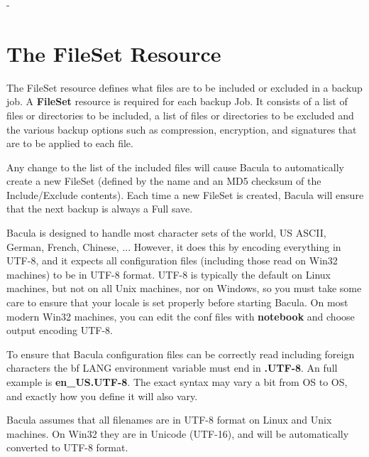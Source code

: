 -%

\section{The FileSet Resource}
\label{FileSetResource}

The FileSet resource defines what files are to be included or excluded in a
backup job.  A {\bf FileSet} resource is required for each backup Job.  It
consists of a list of files or directories to be included, a list of files
or directories to be excluded and the various backup options such as
compression, encryption, and signatures that are to be applied to each
file.

Any change to the list of the included files will cause Bacula to
automatically create a new FileSet (defined by the name and an MD5 checksum
of the Include/Exclude contents).  Each time a new FileSet is created,
Bacula will ensure that the next backup is always a Full save.

Bacula is designed to handle most character sets of the world,
US ASCII, German, French, Chinese, ...  However, it does this by
encoding everything in UTF-8, and it expects all configuration files
(including those read on Win32 machines) to be in UTF-8 format.
UTF-8 is typically the default on Linux machines, but not on all
Unix machines, nor on Windows, so you must take some care to ensure
that your locale is set properly before starting Bacula.  
On most modern Win32 machines, you can edit the conf files with {\bf
notebook} and choose output encoding UTF-8.

To ensure that Bacula configuration files can be correctly read including
foreign characters the {bf LANG} environment variable
must end in {\bf .UTF-8}. An full example is {\bf en\_US.UTF-8}. The
exact syntax may vary a bit from OS to OS, and exactly how you define
it will also vary.

Bacula assumes that all filenames are in UTF-8 format on Linux and
Unix machines. On Win32 they are in Unicode (UTF-16), and will
be automatically converted to UTF-8 format.


